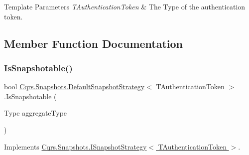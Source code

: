 \begin{DoxyTemplParams}{Template Parameters}
{\em T\+Authentication\+Token} & The Type of the authentication token.\\
\hline
\end{DoxyTemplParams}


\subsection{Member Function Documentation}
\mbox{\label{classCqrs_1_1Snapshots_1_1DefaultSnapshotStrategy_aea1e973d654aaee6f620543be7343fda_aea1e973d654aaee6f620543be7343fda}} 
\subsubsection{\texorpdfstring{Is\+Snapshotable()}{IsSnapshotable()}}
{\footnotesize\ttfamily bool \hyperlink{classCqrs_1_1Snapshots_1_1DefaultSnapshotStrategy}{Cqrs.\+Snapshots.\+Default\+Snapshot\+Strategy}$<$ T\+Authentication\+Token $>$.Is\+Snapshotable (\begin{DoxyParamCaption}\item[{Type}]{aggregate\+Type }\end{DoxyParamCaption})}



Implements \hyperlink{interfaceCqrs_1_1Snapshots_1_1ISnapshotStrategy_a02121821312c4ce2811b31eeaffabe51_a02121821312c4ce2811b31eeaffabe51}{Cqrs.\+Snapshots.\+I\+Snapshot\+Strategy$<$ T\+Authentication\+Token $>$}.

\mbox{\label{classCqrs_1_1Snapshots_1_1DefaultSnapshotStrategy_a59ee11e5c488a40933685e232661df39_a59ee11e5c488a40933685e232661df39}} 
